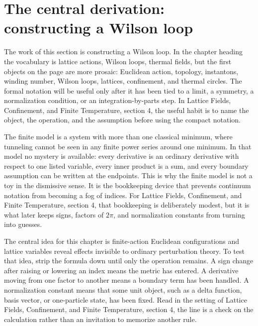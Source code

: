 \section{The central derivation: constructing a Wilson loop}













The work of this section is constructing a Wilson loop.  In the chapter heading the vocabulary is lattice actions, Wilson loops, thermal fields, but the first objects on the page are more prosaic: Euclidean action, topology, instantons, winding number, Wilson loops, lattices, confinement, and thermal circles.  The formal notation will be useful only after it has been tied to a limit, a symmetry, a normalization condition, or an integration-by-parts step.  In Lattice Fields, Confinement, and Finite Temperature, section 4, the useful habit is to name the object, the operation, and the assumption before using the compact notation.

The finite model is a system with more than one classical minimum, where tunneling cannot be seen in any finite power series around one minimum.  In that model no mystery is available: every derivative is an ordinary derivative with respect to one listed variable, every inner product is a sum, and every boundary assumption can be written at the endpoints.  This is why the finite model is not a toy in the dismissive sense.  It is the bookkeeping device that prevents continuum notation from becoming a fog of indices.  For Lattice Fields, Confinement, and Finite Temperature, section 4, that bookkeeping is deliberately modest, but it is what later keeps signs, factors of \(2\pi\), and normalization constants from turning into guesses.

The central idea for this chapter is finite-action Euclidean configurations and lattice variables reveal effects invisible to ordinary perturbation theory.  To test that idea, strip the formula down until only the operation remains.  A sign change after raising or lowering an index means the metric has entered.  A derivative moving from one factor to another means a boundary term has been handled.  A normalization constant means that some unit object, such as a delta function, basis vector, or one-particle state, has been fixed.  Read in the setting of Lattice Fields, Confinement, and Finite Temperature, section 4, the line is a check on the calculation rather than an invitation to memorize another rule.

